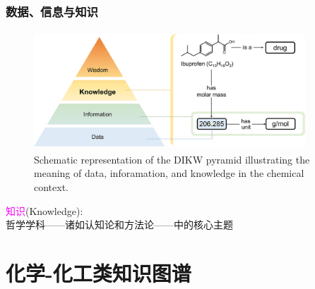 %
%
\frame
{
	\frametitle{数据、信息与知识}
\begin{figure}[h!]
\centering
\vskip -10pt
\includegraphics[height=1.75in,width=4.00in,viewport=0 0 1490 615,clip]{Figures/DIKW_pyramid-illustrating-data_information-knowledge.png}
\caption{\tiny\textrm{Schematic representation of the DIKW pyramid illustrating the meaning of data, inforamation, and knowledge in the chemical context.\cite{ACR56-128_2023}}}%
\label{Fig:Knowledge-based_system}
\end{figure}
\textcolor{magenta}{知识}\textrm{(Knowledge)}:\\
哲学学科——诸如认知论和方法论——中的核心主题
}

\section{化学-化工类知识图谱}
